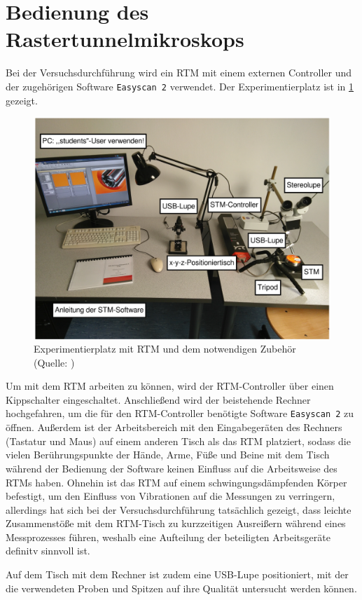 \section{Bedienung des Rastertunnelmikroskops}\label{sec:versuch}
Bei der Versuchsdurchführung wird ein RTM mit einem externen Controller und der zugehörigen Software \texttt{Easyscan 2} verwendet.
Der Experimentierplatz ist in \cref{fig:versuchsplatz} gezeigt.
\begin{figure}[H]
	\centering
	\includegraphics[width=0.8\linewidth]{../figs/versuchsplatz.png}
	\caption{Experimentierplatz mit RTM und dem notwendigen Zubehör (Quelle: \cite{skript})}
	\label{fig:versuchsplatz}
\end{figure}
Um mit dem RTM arbeiten zu können, wird der RTM-Controller über einen Kippschalter eingeschaltet. Anschließend wird der beistehende Rechner
hochgefahren, um die für den RTM-Controller benötigte Software \texttt{Easyscan 2} zu öffnen. Außerdem ist der Arbeitsbereich mit den Eingabegeräten
des Rechners (Tastatur und Maus) auf einem anderen Tisch als das RTM platziert, sodass die vielen Berührungspunkte der Hände, Arme, Füße und Beine mit dem Tisch während der Bedienung
der Software keinen Einfluss auf die Arbeitsweise des RTMs haben. Ohnehin ist das RTM auf einem schwingungsdämpfenden Körper befestigt, um
den Einfluss von Vibrationen auf die Messungen zu verringern, allerdings hat sich bei der Versuchsdurchführung tatsächlich gezeigt, dass leichte Zusammenstöße
mit dem RTM-Tisch zu kurzzeitigen Ausreißern während eines Messprozesses führen, weshalb eine Aufteilung der beteiligten Arbeitsgeräte definitv sinnvoll ist.\par
Auf dem Tisch mit dem Rechner ist zudem eine USB-Lupe positioniert, mit der die verwendeten Proben und Spitzen auf ihre Qualität untersucht werden können.
